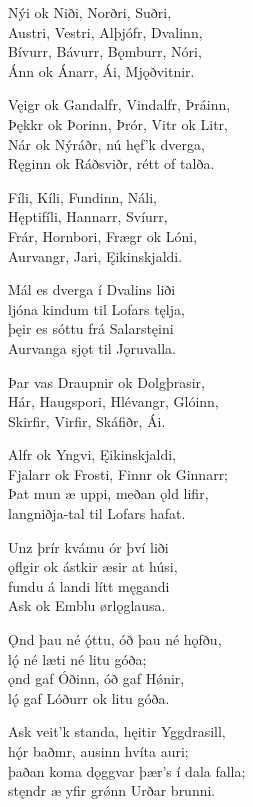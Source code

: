 \bva Nýi ok Niði, \hld Norðri, Suðri, \\
Austri, Vestri, \hld Alþjófr, Dvalinn, \\
Bívurr, Bávurr, \hld Bǫmburr, Nóri, \\
Ánn ok Ánarr, \hld Ái, Mjǫðvitnir.

\bva Vęigr ok Gandalfr, \hld Vindalfr, Þráinn, \\
Þękkr ok Þorinn, \hld Þrór, Vitr ok Litr, \\
Nár ok Nýráðr, \hld nú hęf'k dverga, \\
Ręginn ok Ráðsviðr, \hld rétt of talða.

\bva Fíli, Kíli, \hld Fundinn, Náli, \\
Hęptifíli, \hld Hannarr, Svíurr, \\
Frár, Hornbori, \hld Frægr ok Lóni, \\
Aurvangr, Jari, \hld Ęikinskjaldi.

\bva Mál es dverga \hld í Dvalins liði \\
ljóna kindum \hld til Lofars tęlja, \\
þęir es sóttu \hld frá Salarstęini \\
Aurvanga sjǫt \hld til Jǫruvalla.

\bva Þar vas Draupnir \hld ok Dolgþrasir, \\
Hár, Haugspori, \hld Hlévangr, Glóinn, \\
Skirfir, Virfir, \hld Skáfiðr, Ái.

\bva Alfr ok Yngvi, \hld Ęikinskjaldi, \\
Fjalarr ok Frosti, \hld Finnr ok Ginnarr; \\
Þat mun æ uppi, \hld meðan ǫld lifir, \\
langniðja-tal \hld til Lofars hafat.

\bva Unz þrír kvámu \hld ór því liði \\
ǫflgir ok ástkir \hld æsir at húsi, \\
fundu á landi \hld lítt męgandi \\
Ask ok Emblu \hld ørlǫglausa.

\bva Ǫnd þau né ǫ́ttu, \hld óð þau né hǫfðu, \\
lǫ́ né læti \hld né litu góða; \\
ǫnd gaf Óðinn, \hld óð gaf Hǿnir, \\
lǫ́ gaf Lóðurr \hld ok litu góða.

\bva Ask veit'k standa, \hld hęitir Yggdrasill, \\
hǫ́r baðmr, ausinn \hld hvíta auri; \\
þaðan koma dǫggvar \hld þær's í dala falla; \\
stęndr æ yfir grǿnn \hld Urðar brunni.

